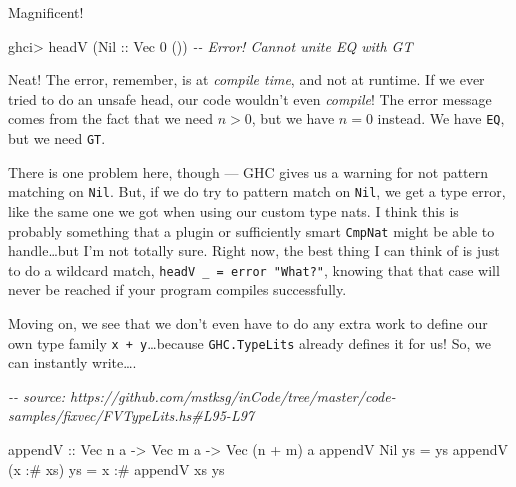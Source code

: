 \documentclass[]{article}
\newenvironment{Shaded}{}{}
\newcommand{\CommentTok}[1]{\textcolor[rgb]{0.38,0.63,0.69}{\textit{#1}}}
\newcommand{\DataTypeTok}[1]{\textcolor[rgb]{0.56,0.13,0.00}{#1}}
\newcommand{\DecValTok}[1]{\textcolor[rgb]{0.25,0.63,0.44}{#1}}
\newcommand{\NormalTok}[1]{#1}
\newcommand{\OperatorTok}[1]{\textcolor[rgb]{0.40,0.40,0.40}{#1}}
\newcommand{\OtherTok}[1]{\textcolor[rgb]{0.00,0.44,0.13}{#1}}
\begin{document}
Magnificent!

\begin{Shaded}
\begin{Highlighting}[]
\NormalTok{ghci}\OperatorTok{\textgreater{}}\NormalTok{ headV (}\DataTypeTok{Nil}\OtherTok{ ::} \DataTypeTok{Vec} \DecValTok{0}\NormalTok{ ())}
\CommentTok{{-}{-} Error!  Cannot unite \textquotesingle{}EQ with \textquotesingle{}GT}
\end{Highlighting}
\end{Shaded}

Neat! The error, remember, is at \emph{compile time}, and not at runtime. If we
ever tried to do an unsafe head, our code wouldn't even \emph{compile}! The
error message comes from the fact that we need \(n > 0\), but we have \(n = 0\)
instead. We have \texttt{EQ}, but we need \texttt{GT}.

There is one problem here, though --- GHC gives us a warning for not pattern
matching on \texttt{Nil}. But, if we do try to pattern match on \texttt{Nil}, we
get a type error, like the same one we got when using our custom type nats. I
think this is probably something that a plugin or sufficiently smart
\texttt{CmpNat} might be able to handle\ldots but I'm not totally sure. Right
now, the best thing I can think of is just to do a wildcard match,
\texttt{headV\ \_\ =\ error\ "What?"}, knowing that that case will never be
reached if your program compiles successfully.

Moving on, we see that we don't even have to do any extra work to define our own
type family \texttt{x\ +\ y}\ldots because \texttt{GHC.TypeLits} already defines
it for us! So, we can instantly write\ldots.

\begin{Shaded}
\begin{Highlighting}[]
\CommentTok{{-}{-} source: https://github.com/mstksg/inCode/tree/master/code{-}samples/fixvec/FVTypeLits.hs\#L95{-}L97}

\OtherTok{appendV ::} \DataTypeTok{Vec}\NormalTok{ n a }\OtherTok{{-}\textgreater{}} \DataTypeTok{Vec}\NormalTok{ m a }\OtherTok{{-}\textgreater{}} \DataTypeTok{Vec}\NormalTok{ (n }\OperatorTok{+}\NormalTok{ m) a}
\NormalTok{appendV }\DataTypeTok{Nil}\NormalTok{       ys }\OtherTok{=}\NormalTok{ ys}
\NormalTok{appendV (x }\OperatorTok{:\#}\NormalTok{ xs) ys }\OtherTok{=}\NormalTok{ x }\OperatorTok{:\#}\NormalTok{ appendV xs ys}
\end{Highlighting}
\end{Shaded}
\end{document}
